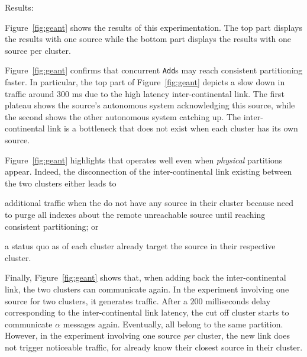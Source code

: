 \begin{asparadesc}



\item [Results:]

Figure~\ref{fig:geant} shows the results of this experimentation. The
top part displays the results with one source while the bottom part
displays the results with one source per cluster.

\noindent Figure~\ref{fig:geant} confirms that concurrent
\texttt{Add}s may reach consistent partitioning faster. In particular,
the top part of Figure~\ref{fig:geant} depicts a slow down in traffic
around $300$ ms due to the high latency inter-continental link. The
first plateau shows the source's autonomous system acknowledging this
source, while the second shows the other autonomous system catching
up.  The inter-continental link is a bottleneck that does not exist
when each cluster has its own source.

\noindent Figure~\ref{fig:geant} highlights that \NAME operates well
even when \emph{physical} partitions appear. Indeed, the disconnection
of the inter-continental link existing between the two clusters
either leads to 
\begin{inparaenum}[(i)]
\item additional traffic when the \processes do not have any source in
  their cluster because \processes need to purge all indexes about the
  remote unreachable source until reaching consistent partitioning; or
  \item a status quo as \processes of each 
  cluster already target the source in their respective cluster.
\end{inparaenum}

\noindent Finally, Figure~\ref{fig:geant} shows that, when adding back the
inter-continental link, the two clusters can communicate again. In the
experiment involving one source for two clusters, it generates
traffic. After a $200$ milliseconds delay corresponding to the inter-continental link
latency, the cut off cluster starts to communicate $\alpha$ messages
again. Eventually, all \processes belong to the same
partition. However, in the experiment involving one source \emph{per}
cluster, the new link does not trigger noticeable traffic, for
\processes already know their closest source in their cluster.

\end{asparadesc}


